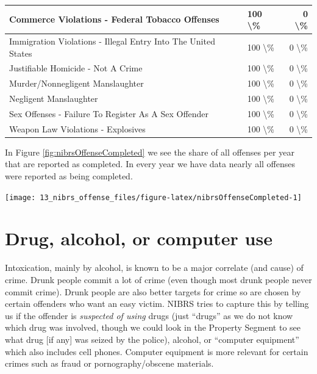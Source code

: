 \documentclass[
]{krantz}
\let\origfigure\figure
\let\endorigfigure\endfigure
\renewenvironment{figure}[1][2] {
    \expandafter\origfigure\expandafter[H]
} {
    \endorigfigure
}
\begin{document}
\begin{longtable}[t]{l|l|r}
\hline
Commerce Violations - Federal Tobacco Offenses & 100 \textbackslash{}\% & 0 \textbackslash{}\%\\
\hline
Immigration Violations - Illegal Entry Into The United States & 100 \textbackslash{}\% & 0 \textbackslash{}\%\\
\hline
Justifiable Homicide - Not A Crime & 100 \textbackslash{}\% & 0 \textbackslash{}\%\\
\hline
Murder/Nonnegligent Manslaughter & 100 \textbackslash{}\% & 0 \textbackslash{}\%\\
\hline
Negligent Manslaughter & 100 \textbackslash{}\% & 0 \textbackslash{}\%\\
\hline
Sex Offenses - Failure To Register As A Sex Offender & 100 \textbackslash{}\% & 0 \textbackslash{}\%\\
\hline
Weapon Law Violations - Explosives & 100 \textbackslash{}\% & 0 \textbackslash{}\%\\
\hline
\end{longtable}

In Figure \ref{fig:nibrsOffenseCompleted} we see the share
of all offenses per year that are reported as completed. In
every year we have data nearly all offenses were reported as
being completed.

\begin{figure}

{\centering \texttt{[image: 13\_nibrs\_offense\_files/figure-latex/nibrsOffenseCompleted-1]} 

}

\caption{The annual percent of offenses reported as completed, 1991-2023.}\label{fig:nibrsOffenseCompleted}
\end{figure}

\section{Drug, alcohol, or computer
use}\label{drug-alcohol-or-computer-use}

Intoxication, mainly by alcohol, is known to be a major
correlate (and cause) of crime. Drunk people commit a lot of
crime (even though most drunk people never commit crime).
Drunk people are also better targets for crime so are chosen
by certain offenders who want an easy victim. NIBRS tries to
capture this by telling us if the offender is
\emph{suspected of using} drugs (just ``drugs'' as we do not
know which drug was involved, though we could look in the
Property Segment to see what drug {[}if any{]} was seized by
the police), alcohol, or ``computer equipment'' which also
includes cell phones. Computer equipment is more relevant
for certain crimes such as fraud or pornography/obscene
materials.
\end{document}

